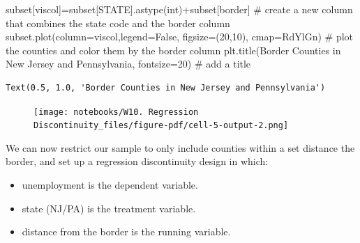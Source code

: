 \documentclass[
  letterpaper,
  DIV=11,
  numbers=noendperiod]{scrreprt}
\newenvironment{Shaded}{\begin{snugshade}}{\end{snugshade}}
\newcommand{\BuiltInTok}[1]{\textcolor[rgb]{0.00,0.23,0.31}{#1}}
\newcommand{\CommentTok}[1]{\textcolor[rgb]{0.37,0.37,0.37}{#1}}
\newcommand{\DecValTok}[1]{\textcolor[rgb]{0.68,0.00,0.00}{#1}}
\newcommand{\NormalTok}[1]{\textcolor[rgb]{0.00,0.23,0.31}{#1}}
\newcommand{\OperatorTok}[1]{\textcolor[rgb]{0.37,0.37,0.37}{#1}}
\newcommand{\StringTok}[1]{\textcolor[rgb]{0.13,0.47,0.30}{#1}}
\newcommand{\VariableTok}[1]{\textcolor[rgb]{0.07,0.07,0.07}{#1}}
\providecommand{\tightlist}{%
  \setlength{\itemsep}{0pt}\setlength{\parskip}{0pt}}\usepackage{longtable,booktabs,array}
\begin{document}
\begin{Shaded}
\begin{Highlighting}[]
\NormalTok{subset[}\StringTok{\textquotesingle{}viscol\textquotesingle{}}\NormalTok{]}\OperatorTok{=}\NormalTok{subset[}\StringTok{\textquotesingle{}STATE\textquotesingle{}}\NormalTok{].astype(}\BuiltInTok{int}\NormalTok{)}\OperatorTok{+}\NormalTok{subset[}\StringTok{\textquotesingle{}border\textquotesingle{}}\NormalTok{] }\CommentTok{\# create a new column that combines the state code and the border column}
\NormalTok{subset.plot(column}\OperatorTok{=}\StringTok{\textquotesingle{}viscol\textquotesingle{}}\NormalTok{,legend}\OperatorTok{=}\VariableTok{False}\NormalTok{, figsize}\OperatorTok{=}\NormalTok{(}\DecValTok{20}\NormalTok{,}\DecValTok{10}\NormalTok{), cmap}\OperatorTok{=}\StringTok{\textquotesingle{}RdYlGn\textquotesingle{}}\NormalTok{) }\CommentTok{\# plot the counties and color them by the border column}
\NormalTok{plt.title(}\StringTok{\textquotesingle{}Border Counties in New Jersey and Pennsylvania\textquotesingle{}}\NormalTok{, fontsize}\OperatorTok{=}\DecValTok{20}\NormalTok{) }\CommentTok{\# add a title}
\end{Highlighting}
\end{Shaded}

\begin{verbatim}
Text(0.5, 1.0, 'Border Counties in New Jersey and Pennsylvania')
\end{verbatim}

\begin{figure}[H]

{\centering \texttt{[image: notebooks/W10. Regression Discontinuity\_files/figure-pdf/cell-5-output-2.png]}

}

\end{figure}

We can now restrict our sample to only include counties within a set
distance the border, and set up a regression discontinuity design in
which:

\begin{itemize}
\tightlist
\item
  unemployment is the dependent variable.
\item
  state (NJ/PA) is the treatment variable.
\item
  distance from the border is the running variable.
\end{itemize}
\end{document}
